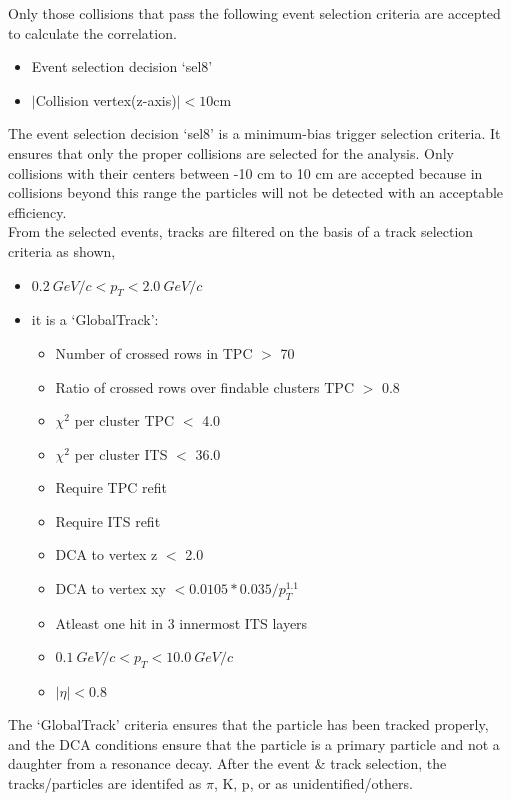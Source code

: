 \documentclass[12pt,a4paper,twoside]{report}
\begin{document}
Only those collisions that pass the following event selection criteria are accepted to calculate the correlation.
\begin{itemize}[label=$\bullet$]
	\item Event selection decision `sel8'
	\item $|$Collision vertex(z-axis)$| < 10$cm
\end{itemize}
The event selection decision `sel8' is a minimum-bias trigger selection criteria. It ensures that only the proper collisions are selected for the analysis. Only collisions with their centers between -10 cm to 10 cm are accepted because in collisions beyond this range the particles will not be detected with an acceptable efficiency.\\

From the selected events, tracks are filtered on the basis of a track selection criteria as shown,
\begin{itemize}[label=$\bullet$]
	\item $0.2\ GeV/c<p_T<2.0\ GeV/c$
	\item it is a `GlobalTrack':
	\begin{itemize}
		\item Number of crossed rows in TPC $>$ 70
		\item Ratio of crossed rows over findable clusters TPC $>$ 0.8
		\item $\chi^2$ per cluster TPC $<$ 4.0
		\item $\chi^2$ per cluster ITS $<$ 36.0
		\item Require TPC refit
		\item Require ITS refit
		\item DCA to vertex z $<$ 2.0
		\item DCA to vertex xy  $<0.0105*0.035/p_T^{1.1}$
		\item Atleast one hit in 3 innermost ITS layers
		\item $0.1\ GeV/c<p_T<10.0\ GeV/c$
		\item $|\eta|<0.8$
	\end{itemize}
\end{itemize}
The `GlobalTrack' criteria ensures that the particle has been tracked properly, and the DCA conditions ensure that the particle is a primary particle and not a daughter from a resonance decay.
After the event \& track selection, the tracks/particles are identifed as $\pi$, K, p, or as unidentified/others.
\end{document}
